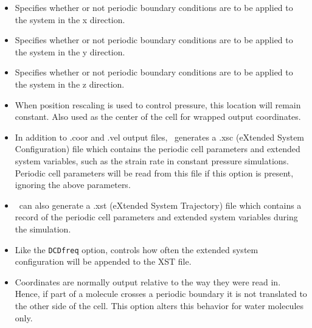 \begin{itemize}

\item
{}
{Specifies whether or not periodic boundary conditions 
are to be applied to the system in the x direction.}

\item
{}
{Specifies whether or not periodic boundary conditions 
are to be applied to the system in the y direction.}

\item
{}
{Specifies whether or not periodic boundary conditions 
are to be applied to the system in the z direction.}

\item
{}
{When position rescaling is used to control pressure, this location will remain constant.  Also used as the center of the cell for wrapped output coordinates.}

\item
{}
{In addition to .coor and .vel output files, \NAMD\ generates a .xsc (eXtended System Configuration) file which contains the periodic cell parameters and extended system variables, such as the strain rate in constant pressure simulations.  Periodic cell parameters will be read from this file if this option is present, ignoring the above parameters.}

\item
{}
{\NAMD\ can also generate a .xst (eXtended System Trajectory) file which contains a record of the periodic cell parameters and extended system variables during the simulation.}

\item
{}
{Like the {\tt DCDfreq} option, controls how often the extended system configuration will be appended to the XST file.}

\item
{}
{Coordinates are normally output relative to the way they were read in.  Hence, if part of a molecule crosses a periodic boundary it is not translated to the other side of the cell.  This option alters this behavior for water molecules only.}

\end{itemize}


